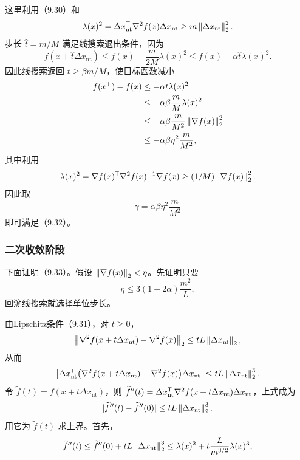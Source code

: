 这里利用（9.30）和
\[
\lambda(x)^2=\Delta x_{\mathrm{nt}}^\mathsf T\nabla^2f(x)\Delta x_{\mathrm{nt}}
\ge m\left\lVert \Delta x_{\mathrm{nt}}\right\rVert_2^2.
\]
步长 $\widehat t=m/M$ 满足线搜索退出条件，因为
\[
f(x+\widehat t\Delta x_{\mathrm{nt}})
\le f(x)-\frac m{2M}\lambda(x)^2
\le f(x)-\alpha\widehat t\lambda(x)^2.
\]
因此线搜索返回 $t\ge\beta m/M$，使目标函数减小
\[
\begin{aligned}
f(x^+)-f(x)&\le-\alpha t\lambda(x)^2\\
&\le-\alpha\beta\frac mM\lambda(x)^2\\
&\le-\alpha\beta\frac m{M^2}\left\lVert \nabla f(x)\right\rVert_2^2\\
&\le-\alpha\beta\eta^2\frac m{M^2},
\end{aligned}
\]
其中利用
\[
\lambda(x)^2=\nabla f(x)^\mathsf T\nabla^2f(x)^{-1}\nabla f(x)
\ge(1/M)\left\lVert \nabla f(x)\right\rVert_2^2.
\]
因此取
\begin{equation}
\gamma=\alpha\beta\eta^2\frac m{M^2}\tag{9.38}
\end{equation}
即可满足（9.32）。

\subsubsection*{二次收敛阶段}
下面证明（9.33）。假设 $\left\lVert \nabla f(x)\right\rVert_2<\eta$。先证明只要
\[
\eta\le3(1-2\alpha)\frac{m^2}{L},
\]
回溯线搜索就选择单位步长。

由Lipschitz条件（9.31），对 $t\ge0$，
\[
\left\lVert \nabla^2f(x+t\Delta x_{\mathrm{nt}})-\nabla^2f(x)\right\rVert_2
\le tL\left\lVert \Delta x_{\mathrm{nt}}\right\rVert_2,
\]
从而
\[
\left|\Delta x_{\mathrm{nt}}^\mathsf T
\bigl(\nabla^2f(x+t\Delta x_{\mathrm{nt}})-\nabla^2f(x)\bigr)
\Delta x_{\mathrm{nt}}\right|
\le tL\left\lVert \Delta x_{\mathrm{nt}}\right\rVert_2^3.
\]
令 $\widetilde f(t)=f(x+t\Delta x_{\mathrm{nt}})$，则
$\widetilde f''(t)=\Delta x_{\mathrm{nt}}^\mathsf T\nabla^2f(x+t\Delta x_{\mathrm{nt}})\Delta x_{\mathrm{nt}}$，上式成为
\[
|\widetilde f''(t)-\widetilde f''(0)|
\le tL\left\lVert \Delta x_{\mathrm{nt}}\right\rVert_2^3.
\]
用它为 $\widetilde f(t)$ 求上界。首先，
\[
\widetilde f''(t)\le\widetilde f''(0)+tL\left\lVert \Delta x_{\mathrm{nt}}\right\rVert_2^3
\le\lambda(x)^2+t\frac L{m^{3/2}}\lambda(x)^3,
\]

